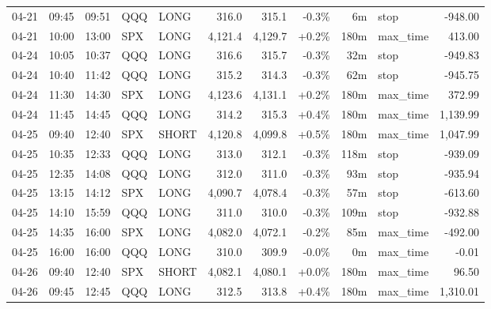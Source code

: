 \documentclass[11pt,a4paper,twoside]{article}
\begin{document}
\begin{center}
\begin{longtable}{>{\color{txtmain}}l l l l l r r r r >{\color{txtmain}}l r}
04-21 & 09:45 & 09:51 & QQQ & LONG & 316.0 & 315.1 & \textcolor{lossred}{-0.3\%} & 6m & stop & \textcolor{lossred}{-948.00} \\
04-21 & 10:00 & 13:00 & SPX & LONG & 4,121.4 & 4,129.7 & \textcolor{wingreen}{+0.2\%} & 180m & max\_time & \textcolor{wingreen}{413.00} \\
04-24 & 10:05 & 10:37 & QQQ & LONG & 316.6 & 315.7 & \textcolor{lossred}{-0.3\%} & 32m & stop & \textcolor{lossred}{-949.83} \\
04-24 & 10:40 & 11:42 & QQQ & LONG & 315.2 & 314.3 & \textcolor{lossred}{-0.3\%} & 62m & stop & \textcolor{lossred}{-945.75} \\
04-24 & 11:30 & 14:30 & SPX & LONG & 4,123.6 & 4,131.1 & \textcolor{wingreen}{+0.2\%} & 180m & max\_time & \textcolor{wingreen}{372.99} \\
04-24 & 11:45 & 14:45 & QQQ & LONG & 314.2 & 315.3 & \textcolor{wingreen}{+0.4\%} & 180m & max\_time & \textcolor{wingreen}{1,139.99} \\
04-25 & 09:40 & 12:40 & SPX & SHORT & 4,120.8 & 4,099.8 & \textcolor{wingreen}{+0.5\%} & 180m & max\_time & \textcolor{wingreen}{1,047.99} \\
04-25 & 10:35 & 12:33 & QQQ & LONG & 313.0 & 312.1 & \textcolor{lossred}{-0.3\%} & 118m & stop & \textcolor{lossred}{-939.09} \\
04-25 & 12:35 & 14:08 & QQQ & LONG & 312.0 & 311.0 & \textcolor{lossred}{-0.3\%} & 93m & stop & \textcolor{lossred}{-935.94} \\
04-25 & 13:15 & 14:12 & SPX & LONG & 4,090.7 & 4,078.4 & \textcolor{lossred}{-0.3\%} & 57m & stop & \textcolor{lossred}{-613.60} \\
04-25 & 14:10 & 15:59 & QQQ & LONG & 311.0 & 310.0 & \textcolor{lossred}{-0.3\%} & 109m & stop & \textcolor{lossred}{-932.88} \\
04-25 & 14:35 & 16:00 & SPX & LONG & 4,082.0 & 4,072.1 & \textcolor{lossred}{-0.2\%} & 85m & max\_time & \textcolor{lossred}{-492.00} \\
04-25 & 16:00 & 16:00 & QQQ & LONG & 310.0 & 309.9 & \textcolor{lossred}{-0.0\%} & 0m & max\_time & \textcolor{lossred}{-0.01} \\
04-26 & 09:40 & 12:40 & SPX & SHORT & 4,082.1 & 4,080.1 & \textcolor{wingreen}{+0.0\%} & 180m & max\_time & \textcolor{wingreen}{96.50} \\
04-26 & 09:45 & 12:45 & QQQ & LONG & 312.5 & 313.8 & \textcolor{wingreen}{+0.4\%} & 180m & max\_time & \textcolor{wingreen}{1,310.01} \\

\end{longtable}
\end{center}
\end{document}
